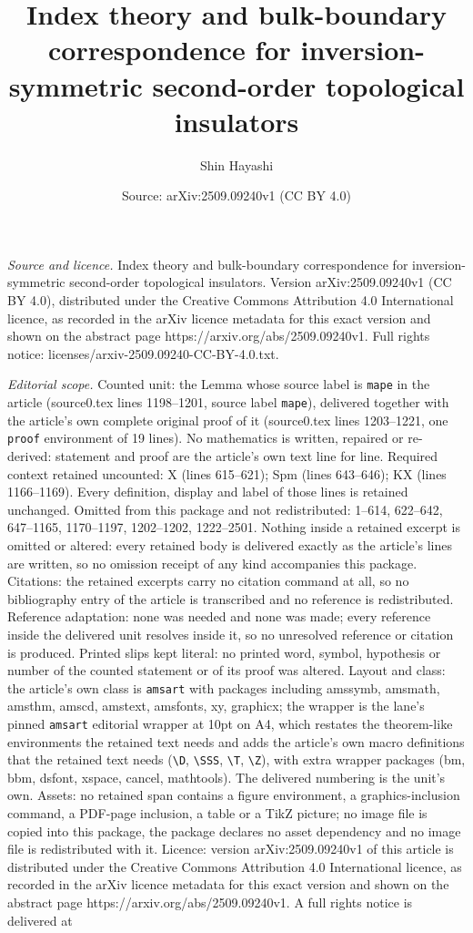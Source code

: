 \documentclass[10pt,a4paper]{amsart}
\title[Index theory and bulk-boundary correspondence for inversion-]{Index theory and bulk-boundary correspondence for inversion-symmetric second-order topological insulators}
\author{Shin Hayashi}
\date{Source: arXiv:2509.09240v1 (CC BY 4.0)}
\begin{document}
\maketitle

\noindent\emph{Source and licence.} Index theory and bulk-boundary correspondence for inversion-symmetric second-order topological insulators. Version arXiv:2509.09240v1 (CC BY 4.0), distributed under the Creative Commons Attribution 4.0 International licence, as recorded in the arXiv licence metadata for this exact version and shown on the abstract page https://arxiv.org/abs/2509.09240v1. Full rights notice: licenses/arxiv-2509.09240-CC-BY-4.0.txt.\par\smallskip

\noindent\textit{Editorial scope.} Counted unit: the Lemma whose source label is \texttt{mape} in the article (source0.tex lines 1198--1201, source label \texttt{mape}), delivered together with the article's own complete original proof of it (source0.tex lines 1203--1221, one \texttt{proof} environment of 19 lines). No mathematics is written, repaired or re-derived: statement and proof are the article's own text line for line. Required context retained uncounted: X (lines 615--621); Spm (lines 643--646); KX (lines 1166--1169). Every definition, display and label of those lines is retained unchanged. Omitted from this package and not redistributed: 1--614, 622--642, 647--1165, 1170--1197, 1202--1202, 1222--2501. Nothing inside a retained excerpt is omitted or altered: every retained body is delivered exactly as the article's lines are written, so no omission receipt of any kind accompanies this package. Citations: the retained excerpts carry no citation command at all, so no bibliography entry of the article is transcribed and no reference is redistributed. Reference adaptation: none was needed and none was made; every reference inside the delivered unit resolves inside it, so no unresolved reference or citation is produced. Printed slips kept literal: no printed word, symbol, hypothesis or number of the counted statement or of its proof was altered. Layout and class: the article's own class is \texttt{amsart} with packages including amssymb, amsmath, amsthm, amscd, amstext, amsfonts, xy, graphicx; the wrapper is the lane's pinned \texttt{amsart} editorial wrapper at 10pt on A4, which restates the theorem-like environments the retained text needs and adds the article's own macro definitions that the retained text needs (\texttt{\textbackslash D}, \texttt{\textbackslash SSS}, \texttt{\textbackslash T}, \texttt{\textbackslash Z}), with extra wrapper packages (bm, bbm, dsfont, xspace, cancel, mathtools). The delivered numbering is the unit's own. Assets: no retained span contains a figure environment, a graphics-inclusion command, a PDF-page inclusion, a table or a TikZ picture; no image file is copied into this package, the package declares no asset dependency and no image file is redistributed with it. Licence: version arXiv:2509.09240v1 of this article is distributed under the Creative Commons Attribution 4.0 International licence, as recorded in the arXiv licence metadata for this exact version and shown on the abstract page https://arxiv.org/abs/2509.09240v1. A full rights notice is delivered at 
\end{document}
